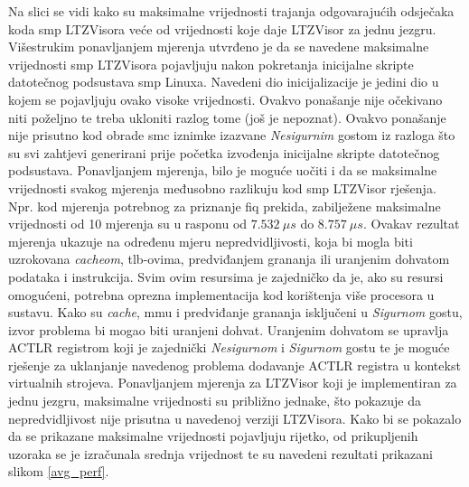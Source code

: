 \documentclass[times, utf8, diplomski, numeric]{fer}
\begin{document}
Na slici se vidi kako su maksimalne vrijednosti trajanja odgovarajućih odsječaka koda \gls{smp} LTZVisora veće od vrijednosti
koje daje LTZVisor za jednu jezgru. Višestrukim ponavljanjem mjerenja utvrđeno je da se navedene maksimalne vrijednosti
\gls{smp} LTZVisora pojavljuju nakon pokretanja inicijalne skripte datotečnog podsustava \gls{smp} Linuxa. Navedeni dio inicijalizacije
je jedini dio u kojem se pojavljuju ovako visoke vrijednosti. Ovakvo ponašanje nije očekivano niti poželjno te treba ukloniti
razlog tome (još je nepoznat). Ovakvo ponašanje nije prisutno kod obrade \gls{smc} iznimke izazvane \textit{Nesigurnim} gostom
iz razloga što su svi zahtjevi generirani prije početka izvođenja inicijalne skripte datotečnog podsustava.
Ponavljanjem mjerenja, bilo je moguće uočiti i da se maksimalne vrijednosti svakog mjerenja međusobno razlikuju kod
\gls{smp} LTZVisor rješenja. Npr. kod mjerenja potrebnog za priznanje \gls{fiq} prekida, zabilježene maksimalne vrijednosti od 10
mjerenja su u rasponu od $7.532~\mu s$ do $8.757~\mu s$. Ovakav rezultat mjerenja ukazuje na određenu mjeru
nepredvidljivosti, koja bi mogla biti uzrokovana \textit{cacheom}, \gls{tlb}-ovima, predviđanjem grananja ili uranjenim
dohvatom  podataka i instrukcija. Svim ovim resursima je zajedničko da je, ako su resursi omogućeni, potrebna oprezna implementacija
kod korištenja više procesora u sustavu.
Kako su \textit{cache}, \gls{mmu} i predviđanje grananja isključeni u \textit{Sigurnom} gostu, izvor
problema bi mogao biti uranjeni dohvat. Uranjenim dohvatom se upravlja ACTLR registrom koji je zajednički
\textit{Nesigurnom} i \textit{Sigurnom} gostu te je moguće rješenje za uklanjanje navedenog problema dodavanje ACTLR
registra u kontekst virtualnih strojeva.
Ponavljanjem mjerenja za LTZVisor koji je implementiran za jednu jezgru, maksimalne vrijednosti su približno jednake,
što pokazuje da nepredvidljivost nije prisutna u navedenoj verziji LTZVisora.
Kako bi se pokazalo da se prikazane maksimalne vrijednosti pojavljuju rijetko, od
prikupljenih uzoraka se je izračunala srednja vrijednost te su navedeni rezultati prikazani slikom \ref{avg_perf}.
\end{document}
